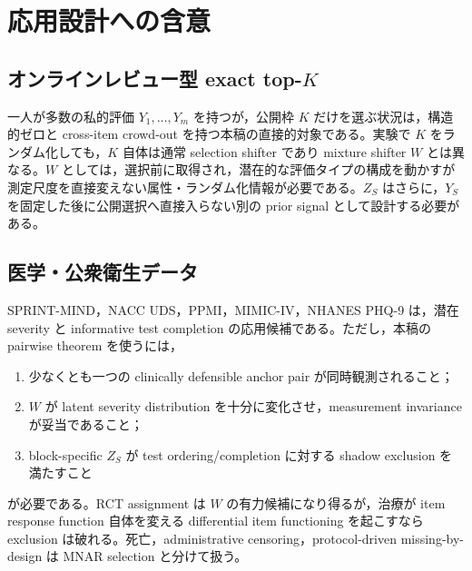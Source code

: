 \documentclass[11pt,a4paper]{ltjsarticle}
\theoremstyle{remark}\newtheorem{remark}{注意}[section]
\begin{document}
\section{応用設計への含意}

\subsection{オンラインレビュー型 exact top-$K$}
一人が多数の私的評価 $Y_1,\ldots,Y_m$ を持つが，公開枠 $K$ だけを選ぶ状況は，構造的ゼロと cross-item crowd-out を持つ本稿の直接的対象である。実験で $K$ をランダム化しても，$K$ 自体は通常 selection shifter であり mixture shifter $W$ とは異なる。$W$ としては，選択前に取得され，潜在的な評価タイプの構成を動かすが測定尺度を直接変えない属性・ランダム化情報が必要である。$Z_S$ はさらに，$Y_S$ を固定した後に公開選択へ直接入らない別の prior signal として設計する必要がある。

\subsection{医学・公衆衛生データ}
SPRINT-MIND，NACC UDS，PPMI，MIMIC-IV，NHANES PHQ-9 は，潜在 severity と informative test completion の応用候補である。ただし，本稿の pairwise theorem を使うには，
\begin{enumerate}
\item 少なくとも一つの clinically defensible anchor pair が同時観測されること；
\item $W$ が latent severity distribution を十分に変化させ，measurement invariance が妥当であること；
\item block-specific $Z_S$ が test ordering/completion に対する shadow exclusion を満たすこと
\end{enumerate}
が必要である。RCT assignment は $W$ の有力候補になり得るが，治療が item response function 自体を変える differential item functioning を起こすなら exclusion は破れる。死亡，administrative censoring，protocol-driven missing-by-design は MNAR selection と分けて扱う。
\end{document}
